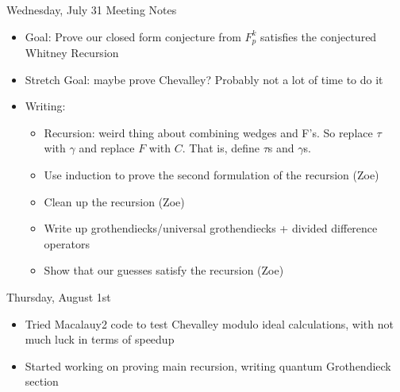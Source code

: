 Wednesday, July 31 Meeting Notes
\begin{itemize}
    \item Goal: Prove our closed form conjecture from $F_p^k$ satisfies the conjectured Whitney Recursion
    \item Stretch Goal: maybe prove Chevalley? Probably not a lot of time to do it
    \item Writing:
    \begin{itemize}
        \item Recursion: weird thing about combining wedges and F's. So replace $\tau$ with $\gamma$ and replace $F$ with $C$. That is, define $\tau$s and $\gamma$s.  
        \item Use induction to prove the second formulation of the recursion (Zoe)
        \item Clean up the recursion (Zoe)
        \item Write up grothendiecks/universal grothendiecks + divided difference operators
        \item Show that our guesses satisfy the recursion (Zoe)
    \end{itemize}
\end{itemize}

Thursday, August 1st
\begin{itemize}
    \item Tried Macalauy2 code to test Chevalley modulo ideal calculations, with not much luck in terms of speedup
    \item Started working on proving main recursion, writing quantum Grothendieck section
\end{itemize}